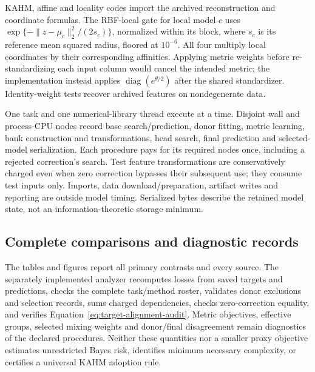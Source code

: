 KAHM, affine and locality codes import the archived reconstruction and
coordinate formulas. The RBF-local gate for local model $c$ uses
$\exp\{-\|z-\mu_c\|_2^2/(2s_c)\}$, normalized within its block,
where $s_c$ is its reference mean squared radius, floored at $10^{-6}$.
All four multiply local coordinates by their corresponding affinities.
Applying metric weights before re-standardizing each input column
would cancel the intended metric; the implementation instead applies
$\operatorname{diag}(e^{\theta/2})$ after the shared standardizer.
Identity-weight tests recover archived features on nondegenerate data.

One task and one numerical-library thread execute at a time. Disjoint
wall and process-CPU nodes record base search/prediction, donor fitting,
metric learning, bank construction and transformations, head search,
final prediction and selected-model serialization. Each procedure pays
for its required nodes once, including a rejected correction's search.
Test feature transformations are conservatively charged even when
zero correction bypasses their subsequent use; they consume test
inputs only. Imports, data download/preparation, artifact writes and
reporting are outside model timing. Serialized bytes describe the
retained model state, not an information-theoretic storage minimum.

\subsection{Complete comparisons and diagnostic records}
\label{app:target-results}

The tables and figures report all primary contrasts and every source. The separately implemented
analyzer recomputes losses from saved targets and predictions, checks
the complete task/method roster, validates donor exclusions and
selection records, sums charged dependencies, checks zero-correction
equality, and verifies Equation~\eqref{eq:target-alignment-audit}.
Metric objectives, effective groups, selected mixing weights and
donor/final disagreement remain diagnostics of the declared procedures.
Neither these quantities nor a smaller proxy objective estimates
unrestricted Bayes risk, identifies minimum necessary complexity, or
certifies a universal KAHM adoption rule.

